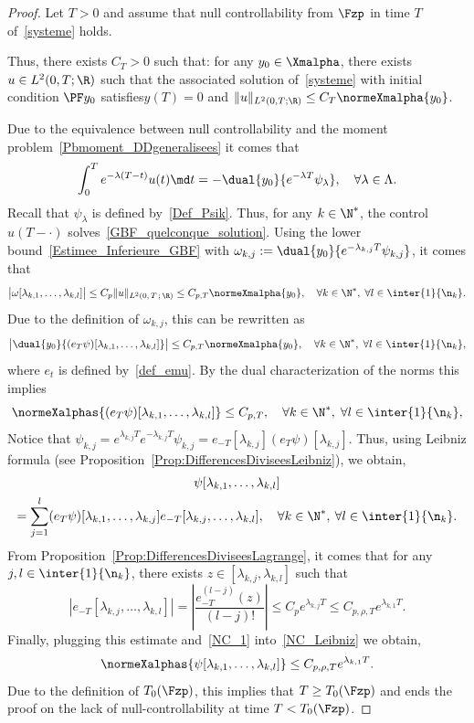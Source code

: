 \begin{proof}
Let $T>0$ and assume that null controllability from $\Fzp$ in time $T$ of~\eqref{systeme} holds.

Thus, there exists $C_T >0$ such that: for any $y_0 \in \Xmalpha$, there exists $u \in L^2(0,T ;\R)$ such that the associated solution of~\eqref{systeme} with initial condition $\PF y_0$ satisfies\linebreak$y(T)=0$ and $ \| u \|_{L^2(0,T ; \R)} \leq C_T \normeXmalpha{y_0}$.

Due to the equivalence between null controllability and the moment problem~\eqref{Pbmoment_DDgeneralisees} it comes that
\[
\int_0^T e^{-\lambda (T-t)} u(t) \md t = - \dual{y_0}{e^{-\lambda T} \psi_\lambda}, \quad \forall \lambda \in \Lambda.
\]
Recall that $\psi_\lambda$ is defined by~\eqref{Def_Psik}. Thus, for any $k \in \N^*$, the control $u(T-\cdot)$ solves~\eqref{GBF_quelconque_solution}. Using the lower bound~\eqref{Estimee_Inferieure_GBF} with $\omega_{k,j} := \dual{y_0}{e^{-\lambda_{k,j} T} \psi_{k,j}}$, it comes that
\[
\big| \omega[\lambda_{k,1}, \dots, \lambda_{k,l}] \big| \leq C_p \| u \|_{L^2(0,\,T\,;\,\R)} \leq C_{p,T} \normeXmalpha{y_0},
\quad \forall k \in \N^*, \; \forall l \in \inter{1}{\n_k}.
\]
Due to the definition of $\omega_{k,j}$, this can be rewritten as
\[
\big| \dual{y_0}{ (e_T \psi)[\lambda_{k,1}, \dots, \lambda_{k,l}]} \big| \leq C_{p,T} \normeXmalpha{y_0},
\quad \forall k \in \N^*, \; \forall l \in \inter{1}{\n_k},
\]
where $e_t$ is defined by~\eqref{def_emu}. By the dual characterization of the norms this implies
\begin{equation}\label{NC_1}
\normeXalphas{(e_T \psi)[\lambda_{k,1}, \dots, \lambda_{k,l}]} \leq C_{p,T},
\quad \forall k \in \N^*, \; \forall l \in \inter{1}{\n_k},
\end{equation}
Notice that $\psi_{k,j} = e^{\lambda_{k,j} T} e^{-\lambda_{k,j} T}\psi_{k,j} = e_{-T}[\lambda_{k,j}] (e_T \psi)[\lambda_{k,j}]$. Thus, using Leibniz formula (see Proposition~\ref{Prop:DifferencesDiviseesLeibniz}), we obtain,
\begin{multline}\label{NC_Leibniz}
\psi[\lambda_{k,1}, \dots, \lambda_{k,l}]\\
= \sum_{j=1}^l (e_T \psi)[\lambda_{k,1}, \dots, \lambda_{k,j}] e_{-T}[\lambda_{k,j}, \dots,\lambda_{k,l}],
\quad \forall k \in \N^*, \: \forall l \in \inter{1}{\n_k}.
\end{multline}
From Proposition~\ref{Prop:DifferencesDiviseesLagrange}, it comes that for any $j,l \in \inter{1}{\n_k}$, there exists $z \in [\lambda_{k,j}, \lambda_{k,l}]$ such that
\[
\left| e_{-T} [\lambda_{k,j}, \dots, \lambda_{k,l}] \right| = \left| \frac{e_{-T}^{(l-j)}(z)}{(l-j)!} \right| \leq C_p e^{\lambda_{k,j} T} \leq C_{p, \rho, T} e^{\lambda_{k,1} T}.
\]
Finally, plugging this estimate and~\eqref{NC_1} into~\eqref{NC_Leibniz} we obtain,
\[
\normeXalphas{\psi[\lambda_{k,1}, \dots, \lambda_{k,l}]} \leq C_{p, \rho, T} e^{\lambda_{k,1}T}.
\]
Due to the definition of $T_0(\Fzp)$, this implies that $T \geq T_0(\Fzp)$ and ends the proof on the lack of null-controllability at time $T<T_0(\Fzp)$.
\end{proof}



